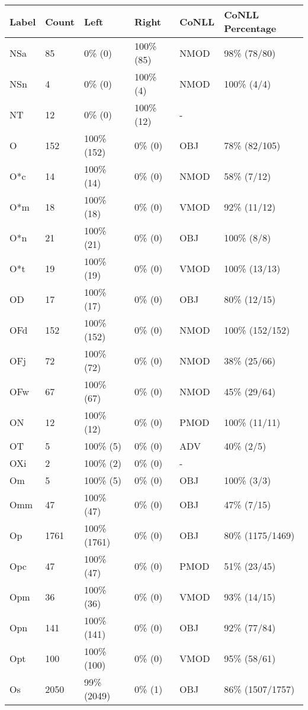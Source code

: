 \begin{figure*}
\begin{tabular}{|l|l|l|l||l|l|}
\hline
Label & Count & Left & Right & CoNLL & CoNLL Percentage\\ 
\hline
 NSa & 85 & 0\% (0) & 100\% (85) & NMOD & 98\% (78/80) \\ 
\hline
 NSn & 4 & 0\% (0) & 100\% (4) & NMOD & 100\% (4/4) \\ 
\hline
 NT & 12 & 0\% (0) & 100\% (12) & - &  \\ 
\hline
 O & 152 & 100\% (152) & 0\% (0) & OBJ & 78\% (82/105) \\ 
\hline
 O*c & 14 & 100\% (14) & 0\% (0) & NMOD & 58\% (7/12) \\ 
\hline
 O*m & 18 & 100\% (18) & 0\% (0) & VMOD & 92\% (11/12) \\ 
\hline
 O*n & 21 & 100\% (21) & 0\% (0) & OBJ & 100\% (8/8) \\ 
\hline
 O*t & 19 & 100\% (19) & 0\% (0) & VMOD & 100\% (13/13) \\ 
\hline
 OD & 17 & 100\% (17) & 0\% (0) & OBJ & 80\% (12/15) \\ 
\hline
 OFd & 152 & 100\% (152) & 0\% (0) & NMOD & 100\% (152/152) \\ 
\hline
 OFj & 72 & 100\% (72) & 0\% (0) & NMOD & 38\% (25/66) \\ 
\hline
 OFw & 67 & 100\% (67) & 0\% (0) & NMOD & 45\% (29/64) \\ 
\hline
 ON & 12 & 100\% (12) & 0\% (0) & PMOD & 100\% (11/11) \\ 
\hline
 OT & 5 & 100\% (5) & 0\% (0) & ADV & 40\% (2/5) \\ 
\hline
 OXi & 2 & 100\% (2) & 0\% (0) & - &  \\ 
\hline
 Om & 5 & 100\% (5) & 0\% (0) & OBJ & 100\% (3/3) \\ 
\hline
 Omm & 47 & 100\% (47) & 0\% (0) & OBJ & 47\% (7/15) \\ 
\hline
 Op & 1761 & 100\% (1761) & 0\% (0) & OBJ & 80\% (1175/1469) \\ 
\hline
 Opc & 47 & 100\% (47) & 0\% (0) & PMOD & 51\% (23/45) \\ 
\hline
 Opm & 36 & 100\% (36) & 0\% (0) & VMOD & 93\% (14/15) \\ 
\hline
 Opn & 141 & 100\% (141) & 0\% (0) & OBJ & 92\% (77/84) \\ 
\hline
 Opt & 100 & 100\% (100) & 0\% (0) & VMOD & 95\% (58/61) \\ 
\hline
 Os & 2050 & 99\% (2049) & 0\% (1) & OBJ & 86\% (1507/1757) \\ 

\end{tabular}
\end{figure*}
